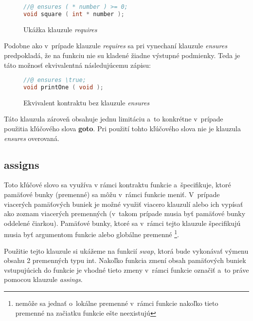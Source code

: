 \begin{figure}[H]
    \centering
    \captionsetup{justification=centering}
\begin{lstlisting}[language=C]
//@ ensures ( * number ) >= 0;
void square ( int * number );
\end{lstlisting}
    \caption{Ukážka klauzule \emph{requires}}
    \label{fig:kontrakt-ensures}
\end{figure}

Podobne ako v~prípade klauzule \emph{requires} sa pri vynechaní klauzule \emph{ensures} predpokladá, že na funkciu nie su kladené žiadne výstupné podmienky. Teda je táto možnosť ekvivalentná následujúcemu zápisu:

\begin{figure}[H]
    \centering
    \captionsetup{justification=centering}
\begin{lstlisting}[language=C]
//@ ensures \true;
void printOne ( void );
\end{lstlisting}
    \caption{Ekvivalent kontraktu bez klauzule \emph{ensures}}
    \label{fig:kontrakt-bez-ensures}
\end{figure}

Táto klauzula zároveň obsahuje jednu limitáciu a~to konkrétne v~prípade použitia kľúčového slova \textbf{goto}. Pri použití tohto kľúčového slova nie je klauzula \emph{ensures} overovaná. \cite{ensures-goto-acsl}

\subsection{assigns}

Toto kľúčové slovo sa využíva v rámci kontraktu funkcie a~špecifikuje, ktoré pamäťové bunky (premenné) sa môžu v~rámci funkcie meniť. V~prípade viacerých pamäťových buniek je možné využiť viacero klauzulí alebo ich vypísať ako zoznam viacerých premenných (v~takom prípade musia byť pamäťové bunky oddelené čiarkou). Pamäťové bunky, ktoré sa v~rámci tejto klauzule špecifikujú musia byť argumentom funkcie alebo globálne premenné \footnote{nemôže sa jednať o~lokálne premenné v~rámci funkcie nakoľko tieto premenné na začiatku funkcie ešte neexistujú}.

Použitie tejto klauzule si ukážeme na funkcií \emph{swap}, ktorá bude vykonávať výmenu obsahu 2 premenných typu int. Nakoľko funkcia zmení obsah pamäťových buniek vstupujúcich do funkcie je vhodné tieto zmeny v~rámci funkcie označiť a~to práve pomocou klauzule \emph{assings}.

